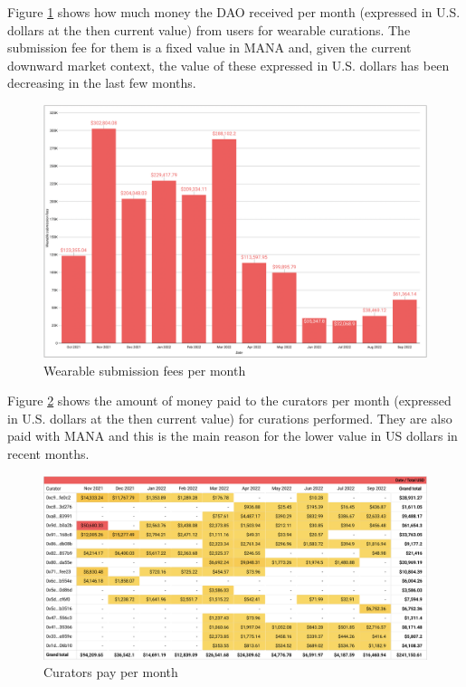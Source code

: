 \documentclass[MSE,Master,english]{twbook}%
\begin{document}
Figure \ref{fig:submission_fees} shows how much money the \gls{DAO} received per month (expressed in U.S. dollars at the then current value) from users for wearable curations. The submission fee for them is a fixed value in \gls{MANA} and, given the current downward market context, the value of these expressed in U.S. dollars has been decreasing in the last few months.
\begin{figure}[H]
  \centering
  \includegraphics[width=\textwidth]{metrics/submission_fees.png}
  \caption{Wearable submission fees per month}
  \label{fig:submission_fees}
\end{figure}

Figure \ref{fig:curators_pay} shows the amount of money paid to the curators per month (expressed in U.S. dollars at the then current value) for curations performed. They are also paid with \gls{MANA} and this is the main reason for the lower value in US dollars in recent months.
\begin{figure}[H]
  \centering
  \includegraphics[width=\textwidth]{metrics/curators_pay.png}
  \caption{Curators pay per month}
  \label{fig:curators_pay}
\end{figure}
\end{document}
